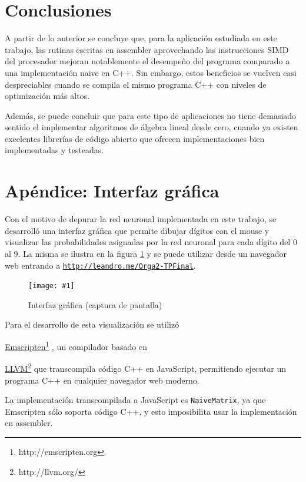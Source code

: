 \documentclass[a4paper, 10pt, twoside]{article}
\newcommand{\img}[3]{
  \begin{figure}[H]
    \begin{center}
      \texttt{[image: \#1]}
    \end{center}
    \caption{#2}
    \label{#3}
  \end{figure}
}
\newcommand{\cc}[1]{\texttt{#1}}
\newcommand{\link}[2]{
  \href{#1}{#2}\footnote{#1}
}
\begin{document}


\section{Conclusiones}

A partir de lo anterior se concluye que, para la aplicación estudiada en este
trabajo, las rutinas escritas en assembler aprovechando las instrucciones SIMD
del procesador mejoran notablemente el desempeño del programa comparado a una
implementación naive en C++. Sin embargo, estos beneficios se vuelven casi
despreciables cuando se compila el mismo programa C++ con niveles de
optimización más altos.

Además, se puede concluir que para este tipo de aplicaciones no tiene demasiado
sentido el implementar algoritmos de álgebra lineal desde cero, cuando ya
existen excelentes librerías de código abierto que ofrecen implementaciones
bien implementadas y testeadas.




\appendix
\section{Apéndice: Interfaz gráfica}

Con el motivo de depurar la red neuronal implementada en este trabajo, se
desarrolló una interfaz gráfica que permite dibujar dígitos con el mouse y
visualizar las probabilidades asignadas por la red neuronal para cada dígito
del 0 al 9. La misma se ilustra en la figura \ref{img:ui} y se puede utilizar
desde un navegador web entrando a
\texttt{\href{http://leandro.me/Orga2-TPFinal}{http://leandro.me/Orga2-TPFinal}}.

\img{ui.png}{Interfaz gráfica (captura de pantalla)}{img:ui}

Para el desarrollo de esta visualización se utilizó
\link{http://emscripten.org}{Emscripten}, un compilador basado en
\link{http://llvm.org/}{LLVM} que transcompila código C++ en JavaScript,
permitiendo ejecutar un programa C++ en cualquier navegador web moderno.

La implementación transcompilada a JavaScript es \cc{NaiveMatrix}, ya que
Emscripten sólo soporta código C++, y esto imposibilita usar la implementación
en assembler.
\end{document}
